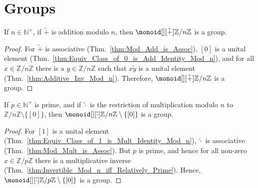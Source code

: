 \section{Groups}

    \begin{theorem}
        If $n\in\mathbb{N}^{+}$, if $\tilde{+}$ is addition modulo $n$,
        then $\monoid[][\tilde{+}]{\mathbb{Z}/n\mathbb{Z}}$ is a group.
    \end{theorem}
    \begin{proof}
        For $\tilde{+}$ is associative (Thm.~\ref{thm:Mod_Add_is_Assoc}),
        $[0]$ is a unital element
        (Thm.~\ref{thm:Equiv_Class_of_0_is_Add_Identity_Mod_n}), and
        for all $x\in\mathbb{Z}/n\mathbb{Z}$ there is a
        $y\in\mathbb{Z}/n\mathbb{Z}$ such that $x\tilde{y}$ is a unital
        element (Thm.~\ref{thm:Additive_Inv_Mod_n}). Therefore,
        $\monoid[][\tilde{+}]{\mathbb{Z}/n\mathbb{Z}}$ is a group.
    \end{proof}
    \begin{theorem}
        If $p\in\mathbb{N}^{+}$ is prime, and if $\tilde{\cdot}$ is the
        restriction of multiplication modulo $n$ to
        $\mathbb{Z}/n\mathbb{Z}\setminus\{[0]\}$, then
        $\monoid[][\tilde{\cdot}]{\mathbb{Z}/n\mathbb{Z}\setminus\{[0]\}}$
        is a group.
    \end{theorem}
    \begin{proof}
        For $[1]$ is a unital element
        (Thm.~\ref{thm:Equiv_Class_of_1_is_Mult_Identity_Mod_n}),
        $\tilde{\cdot}$ is associative (Thm.~\ref{thm:Mod_Mult_is_Assoc}).
        But $p$ is prime, and hence for all non-zero
        $x\in\mathbb{Z}/p\mathbb{Z}$ there is a multiplicative inverse
        (Thm.~\ref{thm:Invertible_Mod_n_iff_Relatively_Prime}). Hence,
        $\monoid[][\tilde{\cdot}]{\mathbb{Z}/p\mathbb{Z}\setminus\{[0]\}}$
        is a group.
    \end{proof}
